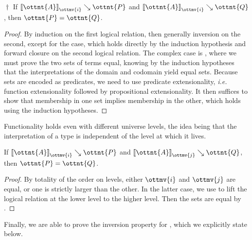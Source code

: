 \documentclass[a4paper,UKenglish,cleveref,autoref,thm-restate]{lipics-v2021}
\makeatletter
\newcommand{\ie}{\textit{i.e.}\@\xspace}
\makeatother
\begin{document}
\begin{lemma}$\!\!{\dagger}$ \label{lem:lr:fixed-func}
  If $ \mathopen{\llbracket}  \ottnt{A}  \mathclose{\rrbracket}_{ \ottmv{i} } \searrow  \ottnt{P} $ and $ \mathopen{\llbracket}  \ottnt{A}  \mathclose{\rrbracket}_{ \ottmv{i} } \searrow  \ottnt{Q} $, then $\ottnt{P} = \ottnt{Q}$.
\end{lemma}

\begin{proof}
  By induction on the first logical relation,
  then generally inversion on the second,
  except for the  case,
  which holds directly by the induction hypothesis
  and forward closure on the second logical relation.
  The complex case is ,
  where we must prove the two sets of terms equal,
  knowing by the induction hypotheses
  that the interpretations of the domain and codomain yield equal sets.
  Because sets are encoded as predicates,
  we need to use predicate extensionality,
  \ie function extensionality followed by propositional extensionality.
  It then suffices to show that membership in one set implies membership in the other,
  which holds using the induction hypotheses.
\end{proof}

Functionality holds even with different universe levels,
the idea being that the interpretation of a type is independent
of the level at which it lives.

\begin{lemma}[Functionality (l.r.)] \label{lem:lr:func}
  If $ \mathopen{\llbracket}  \ottnt{A}  \mathclose{\rrbracket}_{ \ottmv{i} } \searrow  \ottnt{P} $ and $ \mathopen{\llbracket}  \ottnt{A}  \mathclose{\rrbracket}_{ \ottmv{j} } \searrow  \ottnt{Q} $, then $\ottnt{P} = \ottnt{Q}$.
\end{lemma}

\begin{proof}
  By totality of the order on levels,
  either $\ottmv{i}$ and $\ottmv{j}$ are equal,
  or one is strictly larger than the other.
  In the latter case,
  we use  to lift the logical relation at the lower level to the higher level.
  Then the sets are equal by .
\end{proof}

Finally, we are able to prove the inversion property for ,
which we explicitly state below.
\end{document}
